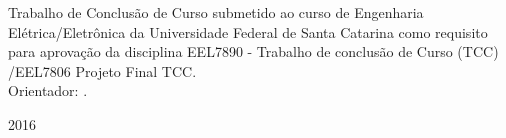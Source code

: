 \begin{titlepage}
  \begin{center}
    {\large \MakeUppercase{\theauthor}}
  \end{center}

  \vfill

  \begin{center}
    {\Large \bfseries \MakeUppercase{\thetitle}}
  \end{center}
  \begin{flushright}
  	\begin{minipage}{0.5\textwidth}
  		Trabalho de Conclusão de Curso submetido ao curso de Engenharia Elétrica/Eletrônica da Universidade Federal de Santa Catarina como requisito para aprovação da disciplina EEL7890 - Trabalho de conclusão de Curso (TCC) /EEL7806 Projeto Final TCC.\\ Orientador: \theadvisor.
  	\end{minipage}
  \end{flushright}
  

  \vfill

  \begin{center}
    {\large \bfseries \MakeUppercase{\theplace} \par 2016}
  \end{center}
\end{titlepage}
